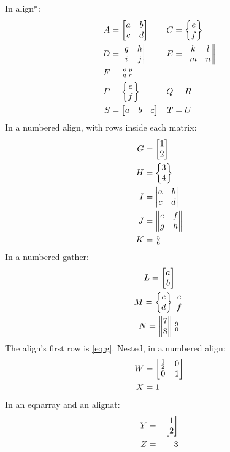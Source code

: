 In align*:
\begin{align*}
A &= \bmatrix a & b \\ c & d \endbmatrix & C &= \Bmatrix e \\ f \endBmatrix \\
D &= \vmatrix g & h \\ i & j \endvmatrix & E &= \Vmatrix k & l \\ m & n \endVmatrix \\
F &= \smallmatrix o & p \\ q & r \endsmallmatrix \\
P &= \Bmatrix e \\ f \endBmatrix & Q &= R \\
S &= \bmatrix a & b & c \endbmatrix & T &= U
\end{align*}
In a numbered align, with rows inside each matrix:
\begin{align}
G &= \bmatrix 1 \\ 2 \endbmatrix \label{eq:g} \\
H &= \Bmatrix 3 \\ 4 \endBmatrix \\
I &= \vmatrix a & b \\ c & d \endvmatrix \\
J &= \Vmatrix e & f \\ g & h \endVmatrix \\
K &= \smallmatrix 5 \\ 6 \endsmallmatrix
\end{align}
In a numbered gather:
\begin{gather}
L = \bmatrix a \\ b \endbmatrix \\
M = \Bmatrix c \\ d \endBmatrix \vmatrix e \\ f \endvmatrix \\
N = \Vmatrix 7 \\ 8 \endVmatrix \smallmatrix 9 \\ 0 \endsmallmatrix
\end{gather}
The align's first row is \eqref{eq:g}. Nested, in a numbered align:
\begin{align}
W &= \bmatrix \smallmatrix 1 \\ 2 \endsmallmatrix & 0 \\ 0 & 1 \endbmatrix \\
X &= 1
\end{align}
In an eqnarray and an alignat:
\begin{eqnarray}
Y &=& \bmatrix 1 \\ 2 \endbmatrix \\
Z &=& 3
\end{eqnarray}
